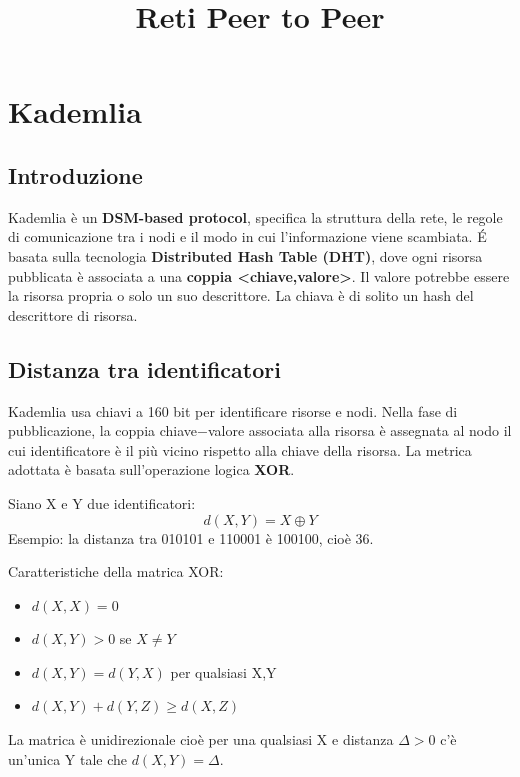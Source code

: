 \title{Reti Peer to Peer}
\maketitle

\chapter{Kademlia}
\section{Introduzione}
Kademlia è un \textbf{DSM-based protocol}, specifica la struttura della rete, le regole di comunicazione tra i nodi e il modo in cui l'informazione viene scambiata. \'E basata sulla tecnologia \textbf{Distributed Hash Table (DHT)}, dove ogni risorsa pubblicata è associata a una \textbf{coppia <chiave,valore>}. Il valore potrebbe essere la risorsa propria o solo un suo descrittore. La chiava è di solito un hash del descrittore di risorsa. 

\section{Distanza tra identificatori}
Kademlia usa chiavi a 160 bit per identificare risorse e nodi. Nella fase di pubblicazione, la coppia chiave$-$valore associata alla risorsa è assegnata al nodo il cui identificatore è il più vicino rispetto alla chiave della risorsa. La metrica adottata è basata sull'operazione logica \textbf{XOR}.

Siano X e Y due identificatori: 
\[
d(X,Y) = X \oplus Y
\]
Esempio: la distanza tra 010101 e 110001 è 100100, cioè 36.

Caratteristiche della matrica XOR:
\begin{itemize}
    \item $d(X,X) = 0$
    \item $d(X,Y) > 0$ se $X \neq Y$ 
    \item $d(X,Y) = d(Y,X)$ per qualsiasi X,Y
    \item $d(X,Y) + d(Y,Z) \geq d(X,Z)$
\end{itemize}
La matrica è unidirezionale cioè per una qualsiasi X e distanza $\Delta > 0$ c'è un'unica Y tale che $d(X,Y) = \Delta$. 

